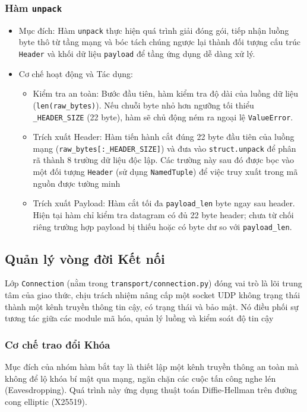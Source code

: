 \subsubsection{Hàm \texttt{unpack}}
\begin{itemize}
    \item Mục đích: Hàm \texttt{unpack} thực hiện quá trình giải đóng gói, tiếp nhận luồng byte thô từ tầng mạng và bóc tách chúng ngược lại thành đối tượng cấu trúc \texttt{Header} và khối dữ liệu \texttt{payload} để tầng ứng dụng dễ dàng xử lý.
    \item Cơ chế hoạt động và Tác dụng:
    \begin{itemize}
        \item Kiểm tra an toàn: Bước đầu tiên, hàm kiểm tra độ dài của luồng dữ liệu (\texttt{len(raw\_bytes)}). Nếu chuỗi byte nhỏ hơn ngưỡng tối thiểu \texttt{\_HEADER\_SIZE} (22 byte), hàm sẽ chủ động ném ra ngoại lệ \texttt{ValueError}. 
        \item Trích xuất Header: Hàm tiến hành cắt đúng 22 byte đầu tiên của luồng mạng (\texttt{raw\_bytes[:\_HEADER\_SIZE]}) và đưa vào \texttt{struct.unpack} để phân rã thành 8 trường dữ liệu độc lập. Các trường này sau đó được bọc vào một đối tượng \texttt{Header} (sử dụng \texttt{NamedTuple}) để việc truy xuất trong mã nguồn được tường minh
        \item Trích xuất Payload: Hàm cắt tối đa \texttt{payload\_len} byte ngay sau header. Hiện tại hàm chỉ kiểm tra datagram có đủ 22 byte header; chưa từ chối riêng trường hợp payload bị thiếu hoặc có byte dư so với \texttt{payload\_len}.
    \end{itemize}
\end{itemize}



\subsection{Quản lý vòng đời Kết nối}

Lớp \texttt{Connection} (nằm trong \texttt{transport/connection.py}) đóng vai trò là lõi trung tâm của giao thức, chịu trách nhiệm nâng cấp một socket UDP không trạng thái thành một kênh truyền thông tin cậy, có trạng thái và bảo mật. Nó điều phối sự tương tác giữa các module mã hóa, quản lý luồng và kiểm soát độ tin cậy

\subsubsection{Cơ chế trao đổi Khóa}
Mục đích của nhóm hàm bắt tay là thiết lập một kênh truyền thông an toàn mà không để lộ khóa bí mật qua mạng, ngăn chặn các cuộc tấn công nghe lén (Eavesdropping). Quá trình này ứng dụng thuật toán Diffie-Hellman trên đường cong elliptic (X25519).

